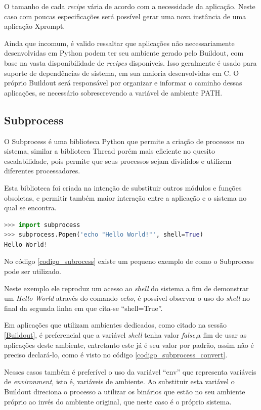 O tamanho de cada \textit{recipe} vária de acordo com a necessidade da aplicação. Neste caso com poucas especificações será possível gerar uma nova instância de uma aplicação Xprompt.

Ainda que incomum, é valido ressaltar que aplicações não necessariamente desenvolvidas em Python podem ter seu ambiente gerado pelo Buildout, com base na vasta disponibilidade de \textit{recipes} disponíveis. Isso geralmente é usado para suporte de dependências de sistema, em sua maioria desenvolvidas em C. O próprio Buildout será responsável por organizar e informar o caminho dessas aplicações, se necessário sobrescrevendo a variável de ambiente PATH.

\subsection{Subprocess}

O Subprocess é uma biblioteca Python que permite a criação de processos no sistema, similar a biblioteca Thread porém mais eficiente no quesito escalabilidade, pois permite que seus processos sejam divididos e utilizem diferentes processadores. 

Esta biblioteca foi criada na intenção de substituir outros módulos e funções obsoletas, e permitir também maior interação entre a aplicação e o sistema no qual se encontra.

{\singlespace
\begin{lstlisting}[caption=Exemplo de uso do Subprocess,language=python,label={codigo_subrocess}]
>>> import subprocess
>>> subprocess.Popen('echo "Hello World!"', shell=True)
Hello World!
\end{lstlisting}
}

No código \ref{codigo_subrocess} existe um pequeno exemplo de como o Subprocess pode ser utilizado.

Neste exemplo ele reproduz um acesso ao \textit{shell} do sistema a fim de demonstrar um \textit{Hello World} através do comando \textit{echo}, é possível observar o uso do \textit{shell} no final da segunda linha em que cita-se ``shell=True''.

Em aplicações que utilizam ambientes dedicados, como citado na sessão \ref{Buildout}, é preferencial que a variável \textit{shell} tenha valor \textit{false},a fim de usar as aplicações deste ambiente, entretanto este já é seu valor por padrão, assim não é preciso declará-lo, como é visto no código \ref{codigo_subprocess_convert}.

Nesses casos também é preferível o uso da variável ``env'' que representa variáveis de \textit{environment}, isto é, variáveis de ambiente. Ao substituir esta variável o Buildout direciona o processo a utilizar os binários que estão no seu ambiente próprio ao invés do ambiente original, que neste caso é o próprio sistema.

